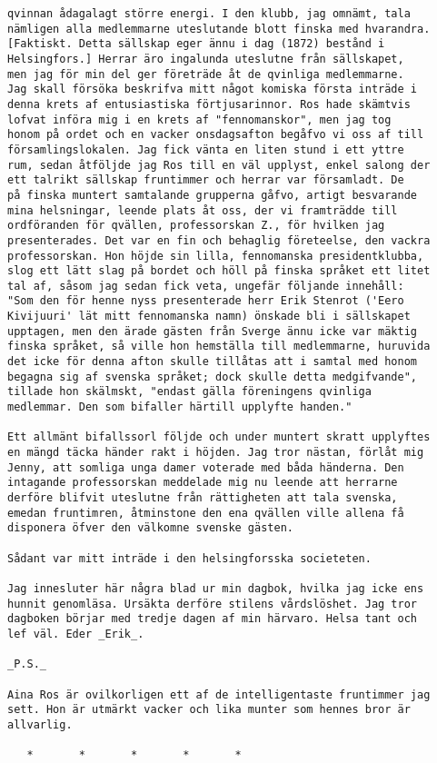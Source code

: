 \begin{verbatim}
qvinnan ådagalagt större energi. I den klubb, jag omnämt, tala
nämligen alla medlemmarne uteslutande blott finska med hvarandra.
[Faktiskt. Detta sällskap eger ännu i dag (1872) bestånd i
Helsingfors.] Herrar äro ingalunda uteslutne från sällskapet,
men jag för min del ger företräde åt de qvinliga medlemmarne.
Jag skall försöka beskrifva mitt något komiska första inträde i
denna krets af entusiastiska förtjusarinnor. Ros hade skämtvis
lofvat införa mig i en krets af "fennomanskor", men jag tog
honom på ordet och en vacker onsdagsafton begåfvo vi oss af till
församlingslokalen. Jag fick vänta en liten stund i ett yttre
rum, sedan åtföljde jag Ros till en väl upplyst, enkel salong der
ett talrikt sällskap fruntimmer och herrar var församladt. De
på finska muntert samtalande grupperna gåfvo, artigt besvarande
mina helsningar, leende plats åt oss, der vi framträdde till
ordföranden för qvällen, professorskan Z., för hvilken jag
presenterades. Det var en fin och behaglig företeelse, den vackra
professorskan. Hon höjde sin lilla, fennomanska presidentklubba,
slog ett lätt slag på bordet och höll på finska språket ett litet
tal af, såsom jag sedan fick veta, ungefär följande innehåll:
"Som den för henne nyss presenterade herr Erik Stenrot ('Eero
Kivijuuri' lät mitt fennomanska namn) önskade bli i sällskapet
upptagen, men den ärade gästen från Sverge ännu icke var mäktig
finska språket, så ville hon hemställa till medlemmarne, huruvida
det icke för denna afton skulle tillåtas att i samtal med honom
begagna sig af svenska språket; dock skulle detta medgifvande",
tillade hon skälmskt, "endast gälla föreningens qvinliga
medlemmar. Den som bifaller härtill upplyfte handen."

Ett allmänt bifallssorl följde och under muntert skratt upplyftes
en mängd täcka händer rakt i höjden. Jag tror nästan, förlåt mig
Jenny, att somliga unga damer voterade med båda händerna. Den
intagande professorskan meddelade mig nu leende att herrarne
derföre blifvit uteslutne från rättigheten att tala svenska,
emedan fruntimren, åtminstone den ena qvällen ville allena få
disponera öfver den välkomne svenske gästen.

Sådant var mitt inträde i den helsingforsska societeten.

Jag innesluter här några blad ur min dagbok, hvilka jag icke ens
hunnit genomläsa. Ursäkta derföre stilens vårdslöshet. Jag tror
dagboken börjar med tredje dagen af min härvaro. Helsa tant och
lef väl. Eder _Erik_.

_P.S._

Aina Ros är ovilkorligen ett af de intelligentaste fruntimmer jag
sett. Hon är utmärkt vacker och lika munter som hennes bror är
allvarlig.

   *       *       *       *       *
\end{verbatim}

